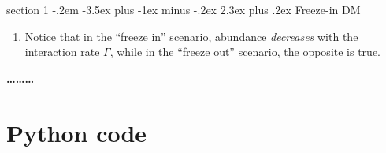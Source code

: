 \documentclass[12pt]{article}
\makeatletter
\newenvironment{problem}{\@startsection
	{section}
	{1}
	{-.2em}
	{-3.5ex plus -1ex minus -.2ex}
	{2.3ex plus .2ex}
	{\pagebreak[3]%
		\large\bf\noindent{Problem }
	}
}
{%
	\begin{center}\large\bf \ldots\ldots\ldots\end{center}}
\makeatother
\begin{document}
\begin{problem}{Freeze-in DM}
\begin{enumerate}[label=(\alph*)]
			\begin{figure}[ht!]
				\centering
			\end{figure}
			
			\item Notice that in the ``freeze in'' scenario, abundance \textit{decreases} with the interaction rate $\Gamma$, while in the ``freeze out'' scenario, the opposite is true.
			
		\end{enumerate}
	\end{problem}


\appendix
\section{Python code}

\end{document}
